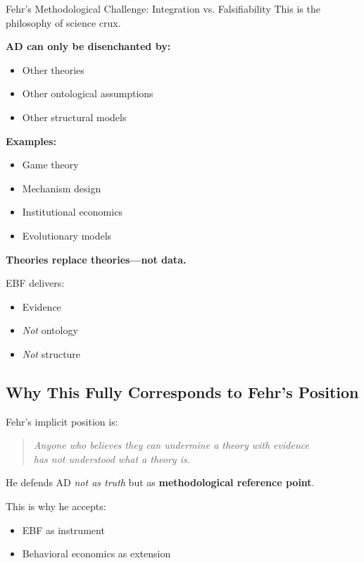 \begin{chapter}{Fehr's Methodological Challenge: Integration vs. Falsifiability}
This is the philosophy of science crux.

\textbf{AD can only be disenchanted by:}
\begin{itemize}[noitemsep]
    \item Other theories
    \item Other ontological assumptions
    \item Other structural models
\end{itemize}

\textbf{Examples:}
\begin{itemize}[noitemsep]
    \item Game theory
    \item Mechanism design
    \item Institutional economics
    \item Evolutionary models
\end{itemize}

\begin{tcolorbox}[colback=red!5!white,colframe=red!75!black,title=\textbf{The Fundamental Principle}]
\begin{center}
\Large
\textbf{Theories replace theories---not data.}
\end{center}
\end{tcolorbox}

EBF delivers:
\begin{itemize}[noitemsep]
    \item Evidence
    \item \textit{Not} ontology
    \item \textit{Not} structure
\end{itemize}

\subsection{Why This Fully Corresponds to Fehr's Position}

Fehr's implicit position is:

\begin{quote}
\textit{Anyone who believes they can undermine a theory with evidence\\
has not understood what a theory is.}
\end{quote}

He defends AD \textit{not as truth} but as \textbf{methodological reference point}.

This is why he accepts:
\begin{itemize}[noitemsep]
    \item EBF as instrument
    \item Behavioral economics as extension
\end{itemize}


\end{chapter}
